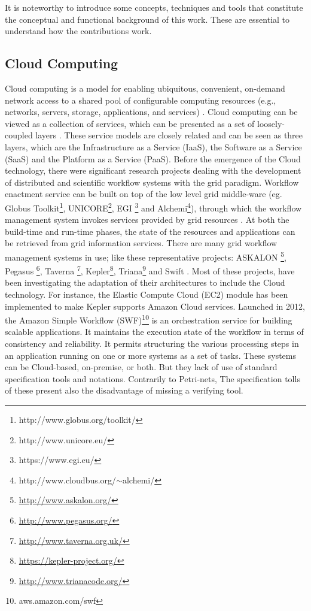 \label{sec:functionality}
%
It is noteworthy to introduce some concepts, techniques and tools that constitute the conceptual and functional background of this work.
%
These are essential to understand how the contributions work.

%
\subsection{Cloud Computing}
%
Cloud computing is a model for enabling ubiquitous, convenient, on-demand network access to a shared pool of configurable computing resources (e.g., networks, servers, storage, applications, and services) \cite{cloud20}.
%
Cloud computing can be viewed as a collection of services, which can be presented as a set of loosely-coupled layers \cite{Mell+11}.
%
These service models are closely related and can be seen as three layers, which are the Infrastructure as a Service (IaaS), the Software as a Service (SaaS) and the Platform as a Service (PaaS).
%
Before the emergence of the Cloud technology, there were significant research projects dealing with the development of distributed and scientific workflow systems with the grid paradigm. 
%
Workflow enactment service can be built on top of the low level grid middle-ware (eg. Globus Toolkit\footnote{http://www.globus.org/toolkit/}, UNICORE\footnote{http://www.unicore.eu/}, EGI \footnote{https://www.egi.eu/} and Alchemi\footnote{http://www.cloudbus.org/$ \sim $alchemi/}), through which the workflow management system invokes services provided by grid resources \cite{YuB05}.
%
At both the build-time and run-time phases, the state of the resources and applications can be retrieved from grid information services. 
%
There are many grid workflow management systems in use; like these representative projects: ASKALON \footnote{\url{http://www.askalon.org/}}, Pegasus \footnote{\url{http://www.pegasus.org/}}, Taverna \footnote{\url{http://www.taverna.org.uk/}}, Kepler\footnote{\url{https://kepler-project.org/}}, Triana\footnote{\url{http://www.trianacode.org/}} and Swift \cite{Zhao+11}.
%
Most of these projects, have been investigating the adaptation of their architectures to include the Cloud technology.
%
For instance, the Elastic Compute Cloud (EC2) module has been implemented to make Kepler supports Amazon Cloud services.
%
Launched in 2012, the Amazon Simple Workflow (SWF)\footnote{aws.amazon.com/swf} is an orchestration service for building scalable applications.
%
It maintains the execution state of the workflow in terms of consistency and reliability.
%
It permits structuring the various processing steps in an application running on one or more systems as a set of tasks.
%
These systems can be Cloud-based, on-premise, or both. But they lack of use of standard specification tools and notations. Contrarily to Petri-nets, The specification tolls  of these present also the disadvantage of missing a verifying tool.
